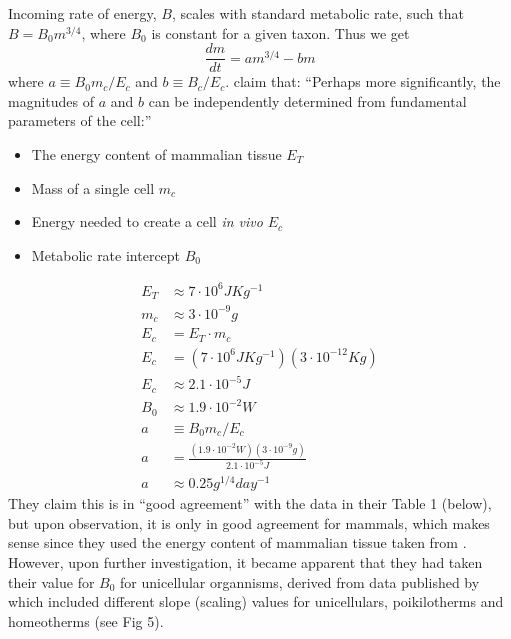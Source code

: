 \documentclass[a4paper]{article} %
\begin{document}
Incoming rate of energy, $B$, scales with standard metabolic rate, such that $B = B_{0}m^{3/4}$, where $B_0$ is constant for a given taxon. Thus we get
\begin{equation}
    \frac{dm}{dt} = am^{3/4} - bm
\end{equation}
where $a \equiv B_{0}m_{c}/E_{c}$ and $b \equiv B_{c}/E_{c}$. \cite{West2001} claim that: ``Perhaps more significantly, the magnitudes of $a$ and $b$ can be independently determined from fundamental parameters of the cell:'' 
\begin{itemize}
    \item The energy content of mammalian tissue $E_T$
    \item Mass of a single cell $m_c$
    \item Energy needed to create a cell \textit{in vivo} $E_c$
    \item Metabolic rate intercept $B_0$
\end{itemize} 
\begin{align*}
    E_T &\approx 7 \cdot 10^6 JKg^{-1} \\
    m_c &\approx 3 \cdot 10^{-9} g \\
    E_c &= E_T \cdot m_c \\
    E_c &= (7 \cdot 10^6 JKg^{-1})(3 \cdot 10^{-12} Kg) \\
    E_c &\approx 2.1 \cdot 10^{-5} J \\
    B_0 &\approx 1.9 \cdot 10^{-2} W \\
    a &\equiv B_{0}m_{c}/E_{c} \\
    a &= \frac{(1.9 \cdot 10^{-2} W)(3 \cdot 10^{-9} g)}{2.1 \cdot 10^{-5} J}\\
    a &\approx 0.25 g^{1/4}day^{-1}
\end{align*}
\newpage
They claim this is in ``good agreement'' with the data in their Table 1 (below), but upon observation, it is only in good agreement for mammals, which makes sense since they used the energy content of mammalian tissue taken from \cite{peters1983}. However, upon further investigation, it became apparent that they had taken their value for $B_0$ for unicellular organnisms, derived from data published by \cite{Hemmingsen1960} which included different slope (scaling) values for unicellulars, poikilotherms and homeotherms (see Fig 5).
\end{document}
